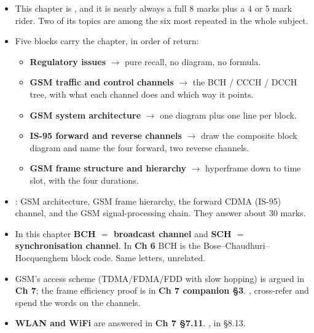 \begin{itemize}
  \item This chapter is , and it is nearly always
        a full 8 marks plus a 4 or 5 mark rider. Two of its topics are among the six most
        repeated in the whole subject.
  \item Five blocks carry the chapter, in order of return:
  \begin{itemize}
    \item \textbf{Regulatory issues}  $\rightarrow$ pure recall, no diagram, no
          formula. 
    \item \textbf{GSM traffic and control channels}  $\rightarrow$ the BCH / CCCH /
          DCCH tree, with what each channel does and which way it points.
    \item \textbf{GSM system architecture}  $\rightarrow$ one diagram plus one line
          per block.
    \item \textbf{IS-95 forward and reverse channels}  $\rightarrow$ draw the
          composite block diagram and name the four forward, two reverse channels.
    \item \textbf{GSM frame structure and hierarchy}  $\rightarrow$ hyperframe down
          to time slot, with the four durations.
  \end{itemize}
  \item {}: GSM architecture, GSM frame hierarchy, the forward
        CDMA (IS-95) channel, and the GSM signal-processing chain. They answer about
        30 marks.
  \item {} In this chapter \textbf{BCH $=$ broadcast channel} and
        \textbf{SCH $=$ synchronisation channel}. In \textbf{Ch 6} BCH is the
        Bose--Chaudhuri--Hocquenghem block code. Same letters, unrelated.
  \item GSM's access scheme (TDMA/FDMA/FDD with slow hopping) is argued in \textbf{Ch 7};
        the frame efficiency proof is in \textbf{Ch 7 companion \S3}. , cross-refer and spend the words on the channels.
  \item \textbf{WLAN and WiFi} are answered in \textbf{Ch 7 \S7.11}. , in \S8.13.
\end{itemize}

\hr


